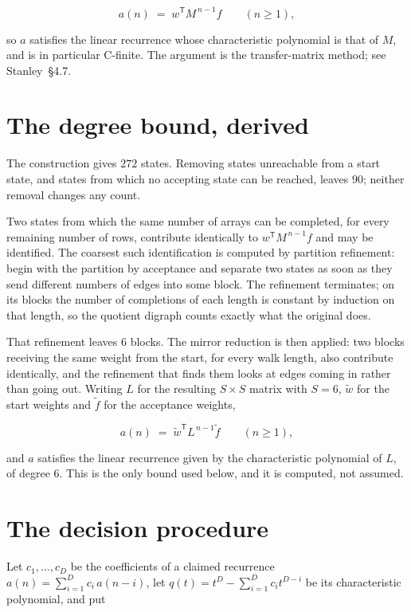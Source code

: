 \documentclass[11pt]{article}
\theoremstyle{definition}
\begin{document}
\[a(n) \;=\; w^{\mathsf T} M^{\,n-1} f \qquad (n \ge 1),\]

so $a$ satisfies the linear recurrence whose characteristic polynomial is that of $M$, and is in particular C-finite. The argument is the transfer-matrix method; see Stanley~\S4.7.

\section{The degree bound, derived}

The construction gives $272$ states. Removing states unreachable from a start state, and states from which no accepting state can be reached, leaves $90$; neither removal changes any count.

Two states from which the same number of arrays can be completed, for every remaining number of rows, contribute identically to $w^{\mathsf T}M^{\,n-1}f$ and may be identified. The coarsest such identification is computed by partition refinement: begin with the partition by acceptance and separate two states as soon as they send different numbers of edges into some block. The refinement terminates; on its blocks the number of completions of each length is constant by induction on that length, so the quotient digraph counts exactly what the original does.

That refinement leaves $6$ blocks. The mirror reduction is then applied: two blocks receiving the same weight from the start, for every walk length, also contribute identically, and the refinement that finds them looks at edges coming in rather than going out. Writing $L$ for the resulting $S \times S$ matrix with $S = 6$, $\tilde w$ for the start weights and $\tilde f$ for the acceptance weights,

\[a(n) \;=\; \tilde w^{\mathsf T} L^{\,n-1} \tilde f \qquad (n \ge 1),\]

and $a$ satisfies the linear recurrence given by the characteristic polynomial of $L$, of degree $6$. This is the only bound used below, and it is computed, not assumed.

\section{The decision procedure}

Let $c_1,\dots,c_D$ be the coefficients of a claimed recurrence $a(n) = \sum_{i=1}^{D} c_i\,a(n-i)$, let $q(t) = t^{D} - \sum_{i=1}^{D} c_i t^{D-i}$ be its characteristic polynomial, and put
\end{document}
